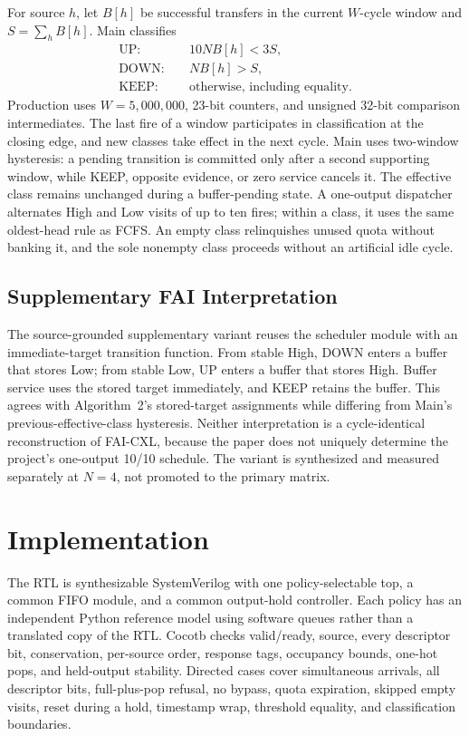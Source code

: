 For source $h$, let $B[h]$ be successful transfers in the current $W$-cycle window and $S=\sum_h B[h]$. Main classifies
\begin{align}
\mathrm{UP}:&\quad 10NB[h]<3S,\\
\mathrm{DOWN}:&\quad NB[h]>S,\\
\mathrm{KEEP}:&\quad \text{otherwise, including equality}.
\end{align}
Production uses $W=5{,}000{,}000$, 23-bit counters, and unsigned 32-bit comparison intermediates. The last fire of a window participates in classification at the closing edge, and new classes take effect in the next cycle. Main uses two-window hysteresis: a pending transition is committed only after a second supporting window, while KEEP, opposite evidence, or zero service cancels it. The effective class remains unchanged during a buffer-pending state. A one-output dispatcher alternates High and Low visits of up to ten fires; within a class, it uses the same oldest-head rule as FCFS. An empty class relinquishes unused quota without banking it, and the sole nonempty class proceeds without an artificial idle cycle.

\subsection{Supplementary FAI Interpretation}
The source-grounded supplementary variant reuses the scheduler module with an immediate-target transition function. From stable High, DOWN enters a buffer that stores Low; from stable Low, UP enters a buffer that stores High. Buffer service uses the stored target immediately, and KEEP retains the buffer. This agrees with Algorithm~2's stored-target assignments while differing from Main's previous-effective-class hysteresis. Neither interpretation is a cycle-identical reconstruction of FAI-CXL, because the paper does not uniquely determine the project's one-output 10/10 schedule. The variant is synthesized and measured separately at $N=4$, not promoted to the primary matrix.

\section{Implementation}
The RTL is synthesizable SystemVerilog with one policy-selectable top, a common FIFO module, and a common output-hold controller. Each policy has an independent Python reference model using software queues rather than a translated copy of the RTL. Cocotb checks valid/ready, source, every descriptor bit, conservation, per-source order, response tags, occupancy bounds, one-hot pops, and held-output stability. Directed cases cover simultaneous arrivals, all descriptor bits, full-plus-pop refusal, no bypass, quota expiration, skipped empty visits, reset during a hold, timestamp wrap, threshold equality, and classification boundaries.

